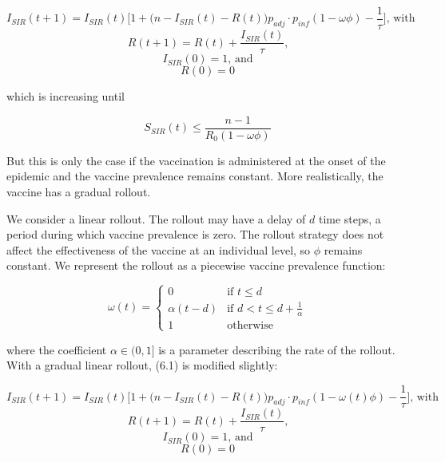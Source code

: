 \documentclass[psamsfonts]{amsart}
\theoremstyle{definition}
\theoremstyle{remark}
\numberwithin{equation}{section}
\begin{document}
\begin{equation}
I_{SIR}(t+1) = I_{SIR}(t)\Bigg[1 + \Big(n - I_{SIR}(t) - R(t)\Big)p_{adj} \cdot p_{inf}(1-\omega\phi) -  \frac{1}{\tau}\Bigg] \text{, with}
\end{equation}
\begin{equation}
R(t+1) = R(t) + \frac{I_{SIR}(t)}{\tau} \text{,} \nonumber
\end{equation}
\begin{equation}
I_{SIR}(0)=1 \text{, and} \nonumber
\end{equation}
\begin{equation}
R(0)=0 \nonumber
\end{equation}

which is increasing until 

\begin{equation}
S_{SIR}(t) \leq \frac{n-1}{R_0 (1-\omega\phi)} 
\end{equation}

But this is only the case if the vaccination is administered at the onset of the epidemic and the vaccine prevalence remains constant. More realistically, the vaccine has a gradual rollout.

We consider a linear rollout. The rollout may have a delay of $d$ time steps, a period during which vaccine prevalence is zero. The rollout strategy does not affect the effectiveness of the vaccine at an individual level, so $\phi$ remains constant. We represent the rollout as a piecewise vaccine prevalence function:

\begin{equation}
\omega(t) = 
	\begin{cases}
		0 & \text{if $t \leq d$} \\
		\alpha(t-d) & \text{if $d < t \leq d + \frac{1}{\alpha}$} \\
		1 & \text{otherwise}
	\end{cases}
\end{equation}

where the coefficient $\alpha \in (0, 1]$ is a parameter describing the rate of the rollout. With a gradual linear rollout, (6.1) is modified slightly:

\begin{equation}
I_{SIR}(t+1) = I_{SIR}(t)\Bigg[1 + \Big(n - I_{SIR}(t) - R(t)\Big)p_{adj} \cdot p_{inf}(1-\omega(t) \phi) -  \frac{1}{\tau}\Bigg] \text{, with}
\end{equation}
\begin{equation}
R(t+1) = R(t) + \frac{I_{SIR}(t)}{\tau} \text{,} \nonumber
\end{equation}
\begin{equation}
I_{SIR}(0)=1 \text{, and} \nonumber
\end{equation}
\begin{equation}
R(0)=0 \nonumber
\end{equation}
\end{document}
